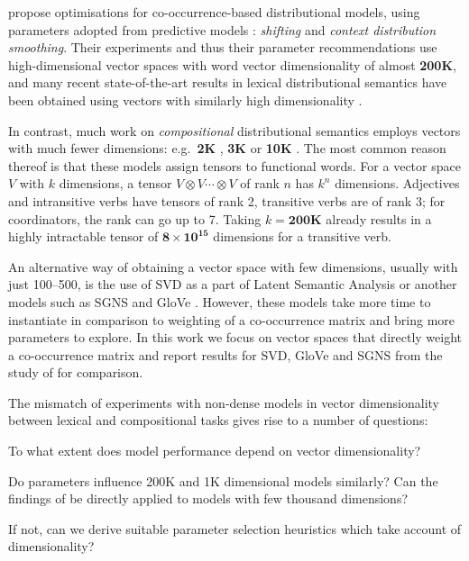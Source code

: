 \documentclass[11pt]{article}
\begin{document}
 propose optimisations for co-occurrence-based distributional models, using parameters adopted from predictive models \cite{mikolov2013efficient}: \emph{shifting} and \emph{context distribution smoothing}. Their experiments and thus their parameter  recommendations use high-dimensional vector spaces with word vector dimensionality of almost \textbf{200K}, and many recent state-of-the-art results in lexical distributional semantics have been obtained using vectors with similarly high dimensionality  \cite{baroni-dinu-kruszewski:2014:P14-1,kiela-clark:2014:CVSC,lapesa2014large}.

In contrast, much work on \emph{compositional} distributional semantics employs vectors with much fewer dimensions: e.g.~\textbf{2K} \cite{Grefenstette:2011:ESC:2145432.2145580,kartsadrqpl2014,milajevs-EtAl:2014:EMNLP2014}, \textbf{3K} \cite{Dinu:2010:MDS:1870658.1870771,milajevs-purver:2014:CVSC} or \textbf{10K} \cite{polajnar-clark:2014:EACL,Baroni2010nouns}. The most common reason thereof is that these models  assign tensors to functional words. For a vector space $V$ with $k$ dimensions,  a tensor $V \otimes V \cdots \otimes V$ of rank $n$ has $k^n$ dimensions. Adjectives and intransitive verbs have tensors of rank 2, transitive verbs are of rank 3; for coordinators, the rank can go up to 7. Taking $k = \textbf{200K}$ already results in a highly intractable tensor of $\textbf{8} \times \textbf{10}^{\textbf{15}}$ dimensions for a transitive verb.

An alternative way of obtaining a vector space with few dimensions, usually with just 100--500, is the use of SVD as a part of Latent Semantic Analysis \cite{ARIS:ARIS1440380105} or another models such as SGNS \cite{mikolov2013efficient} and GloVe \cite{pennington2014glove}. However, these models take more time to instantiate in comparison to weighting of a co-occurrence matrix and bring more parameters to explore. In this work we focus on vector spaces that directly weight a co-occurrence matrix and report results for SVD, GloVe and SGNS from the study of  for comparison.



The mismatch of experiments with non-dense models in vector dimensionality between lexical and compositional tasks gives rise to a number of questions:
\begin{compactitem}
\item To what extent does model performance depend on vector dimensionality?
\item Do parameters influence 200K and 1K dimensional models similarly? Can the findings of  be directly applied to models with few thousand dimensions?
\item If not, can we derive suitable parameter selection heuristics which take account of dimensionality?
\end{compactitem}
\end{document}
